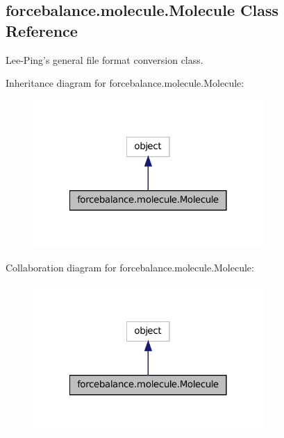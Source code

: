 \hypertarget{classforcebalance_1_1molecule_1_1Molecule}{\subsection{forcebalance.\-molecule.\-Molecule Class Reference}
\label{classforcebalance_1_1molecule_1_1Molecule}
}


Lee-\/\-Ping's general file format conversion class.  




Inheritance diagram for forcebalance.\-molecule.\-Molecule\-:\nopagebreak
\begin{figure}[H]
\begin{center}
\leavevmode
\includegraphics[width=248pt]{classforcebalance_1_1molecule_1_1Molecule__inherit__graph}
\end{center}
\end{figure}


Collaboration diagram for forcebalance.\-molecule.\-Molecule\-:\nopagebreak
\begin{figure}[H]
\begin{center}
\leavevmode
\includegraphics[width=248pt]{classforcebalance_1_1molecule_1_1Molecule__coll__graph}
\end{center}
\end{figure}
